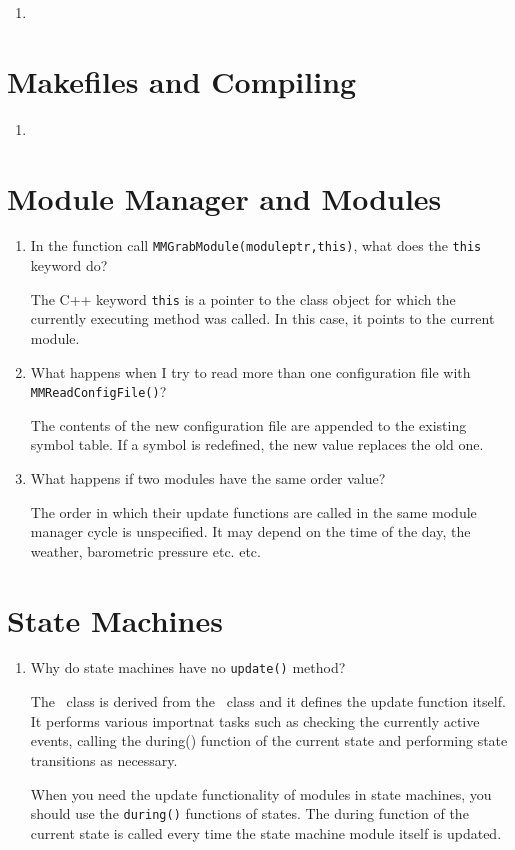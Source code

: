 \begin{enumerate}
\item
\end{enumerate}

\section{Makefiles and Compiling}

\begin{enumerate}
\item
\end{enumerate}

\section{Module Manager and Modules}

\begin{enumerate}
\item{In the function call {\tt MMGrabModule(moduleptr,this)}, what does the
    {\tt this} keyword do?}\par
The C++ keyword {\tt this} is a pointer to the class object for which the
currently executing method was called. In this case, it points to the
current module.

\item{What happens when I try to read more than one configuration file with
    {\tt MMReadConfigFile()}?}\par
The contents of the new configuration file are appended to the existing
symbol table. If a symbol is redefined, the new value replaces the old one.

\item{What happens if two modules have the same order value?}\par
The order in which their update functions are called in the same module
manager cycle is unspecified. It may depend on the time of the day, the
weather, barometric pressure etc. etc.
\end{enumerate}

\section{State Machines}

\begin{enumerate}
\item{Why do state machines have no {\tt update()} method?}\par

The \StateMachine\ class is derived from the \Module\ class and it defines
the update function itself. It performs various importnat tasks such as
checking the currently active events, calling the during() function of the
current state and performing state transitions as necessary.

When you need the update functionality of modules in state machines, you
should use the {\tt during()} functions of states. The during function of
the current state is called every time the state machine module itself is
updated.
\end{enumerate}

